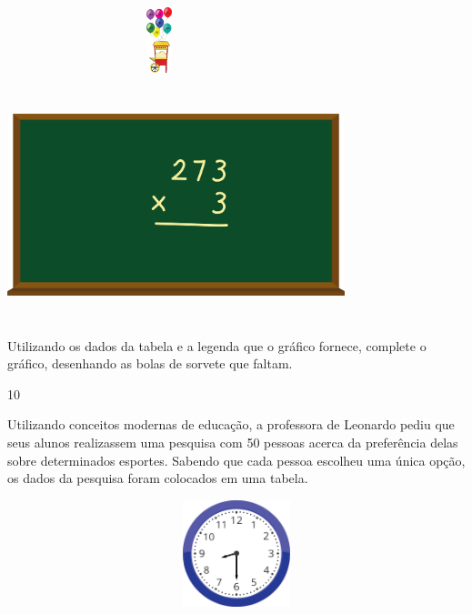 \begin{multicols}{2}
{\begin{escolha}
{%

\includegraphics[width=3.47436in,height=0.75022in]{media/image98.png}

\includegraphics[width=3.86538in,height=2.63899in]{media/image99.png}

Utilizando os dados da tabela e a legenda que o gráfico fornece,
complete o gráfico, desenhando as bolas de sorvete que faltam.


\num{10}

Utilizando conceitos modernas de educação, a professora de Leonardo
pediu que seus alunos realizassem uma pesquisa com 50 pessoas acerca da
preferência delas sobre determinados esportes. Sabendo que cada pessoa
escolheu uma única opção, os dados da pesquisa foram colocados em uma tabela.


\includegraphics[width=5.39213in,height=1.22511in]{media/image100.png}

}
\end{escolha}}
\end{multicols}
